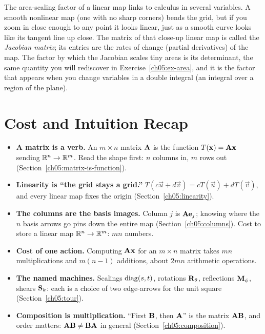 \begin{connectionbox}
The area-scaling factor of a linear map links to calculus in several variables.
A smooth nonlinear map (one with no sharp corners) bends the grid, but if you zoom
in close enough to any point it looks linear, just as a smooth curve looks like
its tangent line up close. The matrix of that close-up linear map is called the
\emph{Jacobian matrix}; its entries are the rates of change (partial derivatives)
of the map. The factor by which the Jacobian scales tiny areas is its determinant,
the same quantity you will rediscover in Exercise~\ref{ch05:ex-area}, and it is
the factor that appears when you change variables in a double integral (an
integral over a region of the plane).
\end{connectionbox}

\section{Cost and Intuition Recap}
\label{ch05:recap}

\begin{itemize}
\item \textbf{A matrix is a verb.} An $m\times n$ matrix $\mathbf{A}$ is the function
  $T(\mathbf{x})=\mathbf{A}\mathbf{x}$ sending $\mathbb{R}^n\to\mathbb{R}^m$. Read the shape first: $n$
  columns in, $m$ rows out (Section~\ref{ch05:matrix-is-function}).
\item \textbf{Linearity is ``the grid stays a grid.''} $T(c\vec{u}+d\vec{v}) =
  cT(\vec{u})+dT(\vec{v})$, and every linear map fixes the origin
  (Section~\ref{ch05:linearity}).
\item \textbf{The columns are the basis images.} Column $j$ is $\mathbf{A}\mathbf{e}_j$;
  knowing where the $n$ basis arrows go pins down the entire map
  (Section~\ref{ch05:columns}). Cost to store a linear map $\mathbb{R}^n\to\mathbb{R}^m$:
  $mn$ numbers.
\item \textbf{Cost of one action.} Computing $\mathbf{A}\mathbf{x}$ for an $m\times n$
  matrix takes $mn$ multiplications and $m(n-1)$ additions, about $2mn$
  arithmetic operations.
\item \textbf{The named machines.} Scalings $\operatorname{diag}(s,t)$, rotations
  $\mathbf{R}_\theta$, reflections $\mathbf{M}_\phi$, shears $\mathbf{S}_k$: each is
  a choice of two edge-arrows for the unit square (Section~\ref{ch05:tour}).
\item \textbf{Composition is multiplication.} ``First $\mathbf{B}$, then $\mathbf{A}$''
  is the matrix $\mathbf{A}\mathbf{B}$, and order matters:
  $\mathbf{A}\mathbf{B}\neq\mathbf{B}\mathbf{A}$ in general (Section~\ref{ch05:composition}).
\end{itemize}

